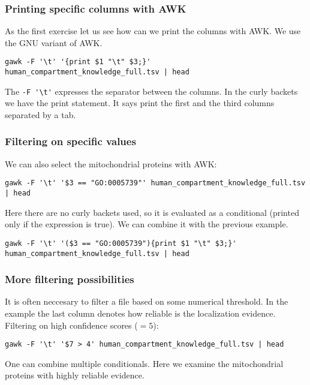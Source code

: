 \documentclass{article}\usepackage[]{graphicx}\usepackage[usenames,dvipsnames]{color}
\begin{document}
\subsubsection*{Printing specific columns with AWK}

As the first exercise let us see how can we print the columns with AWK. We use the GNU variant of AWK.

\begin{verbatim}
gawk -F '\t' '{print $1 "\t" $3;}' human_compartment_knowledge_full.tsv | head
\end{verbatim}

The \verb+-F '\t'+ expresses the separator between the columns. In the curly backets we have the print statement. It says print the first and the third columns separated by a tab.

\subsubsection*{Filtering on specific values}

We can also select the mitochondrial proteins with AWK:

\begin{verbatim}
gawk -F '\t' '$3 == "GO:0005739"' human_compartment_knowledge_full.tsv | head
\end{verbatim}

Here there are no curly backets used, so it is evaluated as a conditional (printed only if the expression is true). We can combine it with the previous example.

\begin{verbatim}
gawk -F '\t' '($3 == "GO:0005739"){print $1 "\t" $3;}' human_compartment_knowledge_full.tsv | head
\end{verbatim}

\subsubsection*{More filtering possibilities}

It is often neccesary to filter a file based on some numerical threshold. In the example the last column denotes how reliable is the localization evidence. Filtering on high confidence scores ($= 5$):

\begin{verbatim}
gawk -F '\t' '$7 > 4' human_compartment_knowledge_full.tsv | head
\end{verbatim}

One can combine multiple conditionals. Here we examine the mitochondrial proteins with highly reliable evidence.
\end{document}
